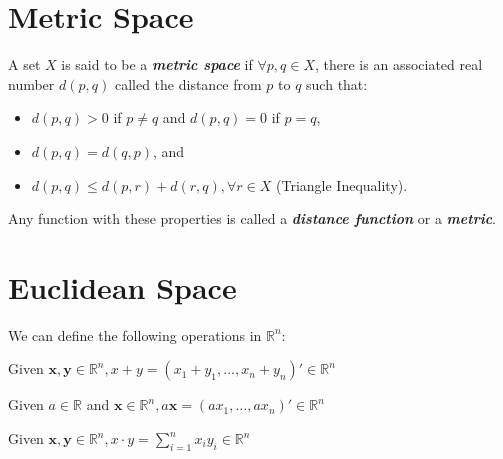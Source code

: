 
\section{Metric Space}

\begin{definition}
    A set $X$ is said to be a \textbf{\textit{metric space}} if $\forall p,q \in X$, there is an associated real number $d(p,q)$ called the distance from $p$ to $q$ such that:
    \begin{itemize}
        \item $d(p,q)>0$ if $p \neq q$ and $d(p,q) = 0$ if $p=q$,
        \item $d(p,q) = d(q,p)$, and
        \item $d(p,q) \leq d(p,r) + d(r,q), \forall r \in X$ (Triangle Inequality).
    \end{itemize}
\end{definition}

\begin{remark*}
    Any function with these properties is called a \textbf{\textit{distance function}} or a \textbf{\textit{metric}}.
\end{remark*}

\section{Euclidean Space}

We can define the following operations in $\mathbb{R}^{n}$:

\begin{definition}
    Given $\mathbf{x, y} \in \mathbb{R}^{n}, x+y = (x_{1}+y_{1}, \dots,x_{n}+y_{n})' \in \mathbb{R}^{n}$
\end{definition}

\begin{definition}
    Given $a \in \mathbb{R}$ and $\mathbf{x} \in \mathbb{R}^{n}, a \mathbf{x} = (ax_1,\dots,ax_n)' \in \mathbb{R}^{n}$
\end{definition}

\begin{definition}
    Given $\mathbf{x, y} \in \mathbb{R}^{n}, x\cdot y = \sum_{i=1}^{n} x_{i}y_{i} \in \mathbb{R}^{n}$
\end{definition}

